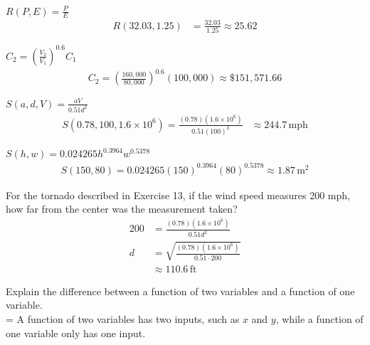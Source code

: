 \documentclass[12pt]{article}
\newenvironment{problem}[2][]{
    \begin{trivlist}
        \item[
            {\bfseries #1}
            {\bfseries #2.}
        ]
}{\end{trivlist}}
\begin{document}
\begin{problem}{9}
$R\left(P, E\right) = \frac{P}{E}$
\begin{align}
R\left(32.03, 1.25\right) &= \frac{32.03}{1.25} \approx 25.62
\end{align}
\end{problem}

\begin{problem}{11}
$C_2 = \left(\frac{V_2}{V_1}\right)^{0.6} C_1$
\begin{align}
C_2 = \left(\frac{160,000}{80,000}\right)^{0.6} \left(100,000\right) \approx \$151,571.66
\end{align}
\end{problem}

\begin{problem}{13}
$S\left(a,d,V\right) = \frac{aV}{0.51d^2}$
\begin{align}
S\left(0.78,100, 1.6 \times 10^6\right) = \frac{\left(0.78\right)\left(1.6 \times 10^6\right)}{0.51 \left(100\right)^2} &\approx 244.7 \,\text{mph}
\end{align}
\end{problem}

\begin{problem}{15}
$S\left(h,w\right) = 0.024265h^{0.3964} w^{0.5378}$
\begin{align}
S\left(150,80\right) = 0.024265\left(150\right)^{0.3964} \left(80\right)^{0.5378} \approx 1.87 \,\text{m}^2
\end{align}
\end{problem}

\begin{problem}{17}
For the tornado described in Exercise 13, if the wind speed measures 200 mph, how far from the center was the measurement taken?
\begin{align}
200 &= \frac{\left(0.78\right)\left(1.6 \times 10^6\right)}{0.51d^2} \\
d &= \sqrt{\frac{\left(0.78\right)\left(1.6 \times 10^6\right)}{0.51 \cdot 200}} \\
&\approx 110.6 \,\text{ft}
\end{align}
\end{problem}

\begin{problem}{19}
Explain the difference between a function of two variables and a function of one variable.\bigskip\\

\hangindent=\parindent
A function of two variables has two inputs, such as $x$ and $y$, while a function of one variable only has one input.
\end{problem}
\end{document}
